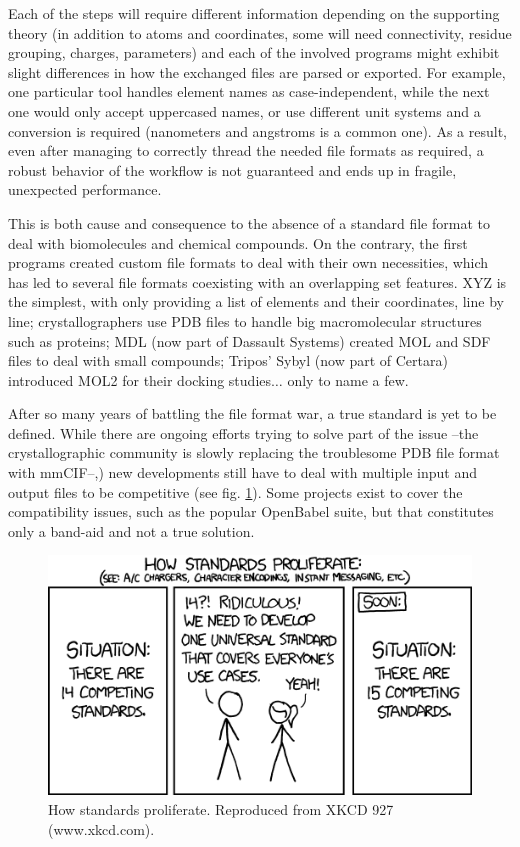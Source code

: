 Each of the steps will require different information depending on the supporting theory (in addition to atoms and coordinates, some will need connectivity, residue grouping, charges, parameters) and each of the involved programs might exhibit slight differences in how the exchanged files are parsed or exported. For example, one particular tool handles element names as case-independent, while the next one would only accept uppercased names, or use different unit systems and a conversion is required (nanometers and angstroms is a common one). As a result, even after managing to correctly thread the needed file formats as required, a robust behavior of the workflow is not guaranteed and ends up in fragile, unexpected performance.

This is both cause and consequence to the absence of a standard file format to deal with biomolecules and chemical compounds. On the contrary, the first programs created custom file formats to deal with their own necessities, which has led to several file formats coexisting with an overlapping set features. XYZ is the simplest, with only providing a list of elements and their coordinates, line by line; crystallographers use PDB files to handle big macromolecular structures such as proteins; MDL (now part of Dassault Systems) created MOL and SDF files to deal with small compounds; Tripos’ Sybyl (now part of Certara) introduced MOL2 for their docking studies$ \ldots $  only to name a few.

After so many years of battling the file format war, a true standard is yet to be defined. While there are ongoing efforts trying to solve part of the issue --the crystallographic community is slowly replacing the troublesome PDB file format with mmCIF--,\cite{bourne1997,berman2007}) new developments still have to deal with multiple input and output files to be competitive (see fig. \ref{fig:xkcd}). Some projects exist to cover the compatibility issues, such as the popular OpenBabel suite, \cite{oboyle2011} but that constitutes only a band-aid and not a true solution.

\begin{figure}[H]
	\includegraphics[width=\textwidth]{./figures/01/xkcd927.png}
	\caption[Proliferation of standards]{How standards proliferate. Reproduced from XKCD 927 (www.xkcd.com).}
	\label{fig:xkcd}
\end{figure}


